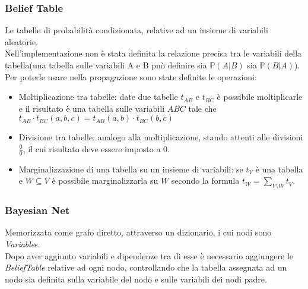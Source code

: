 \documentclass[a4paper]{article}
\begin{document}
\subsubsection{Belief Table}
Le tabelle di probabilità condizionata, relative ad un insieme di variabili aleatorie.\\
Nell'implementazione non è stata definita la relazione precisa tra le variabili della tabella(una tabella sulle variabili A e B può definire sia $\mathbb{P}(A|B)$ sia $\mathbb{P}(B|A)$).\\
Per poterle usare nella propagazione sono state definite le operazioni:
\begin{itemize}
\item Moltiplicazione tra tabelle: date due tabelle $t_{AB}$ e $t_{BC}$ è possibile moltiplicarle e il risultato è una tabella sulle variabili $ABC$ tale che $t_{AB}\cdot t_{BC}(a,b,c)=t_{AB}(a,b)\cdot t_{BC}(b,c)$
\item Divisione tra tabelle: analogo alla moltiplicazione, stando attenti alle divisioni $\frac{0}{0}$, il cui risultato deve essere imposto a 0.
\item Marginalizzazione di una tabella su un insieme di variabili: se $t_V$ è una tabella e $W\subseteq V$ è possibile marginalizzarla su $W$ secondo la formula $t_W = \sum_{V\setminus W}t_V$.
\end{itemize}
\subsubsection{Bayesian Net}
Memorizzata come grafo diretto, attraverso un dizionario, i cui nodi sono \emph{Variable}s.\\
Dopo aver aggiunto variabili e dipendenze tra di esse è necessario aggiungere le \emph{BeliefTable} relative ad ogni nodo, controllando che la tabella assegnata ad un nodo sia definita sulla variabile del nodo e sulle variabili dei nodi padre.
\end{document}
